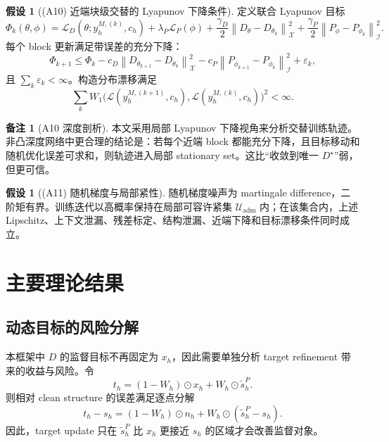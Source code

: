 \documentclass[11pt,a4paper,UTF8,fontset=fandol]{ctexart}
\theoremstyle{definition}
\newtheorem{assumption}[theorem]{假设}
\newtheorem{remark}[theorem]{备注}
\newcommand{\norm}[1]{\left\lVert#1\right\rVert}
\newcommand{\cL}{\mathcal{L}}
\begin{document}
\begin{assumption}[(A10) 近端块级交替的 Lyapunov 下降条件]
定义联合 Lyapunov 目标
\begin{equation}
\label{eq:lyapunov-coreA}
    \Phi_k(\theta,\phi)=
    \cL_D(\theta;y_h^{M,(k)},c_h)
    +\lambda_P\cL_P(\phi)
    +\frac{\gamma_D}{2}\norm{D_\theta-D_{\theta_k}}_{\mathcal X}^2
    +\frac{\gamma_P}{2}\norm{P_\phi-P_{\phi_k}}_{\mathcal I}^2.
\end{equation}
每个 block 更新满足带误差的充分下降：
\begin{equation}
\label{eq:lyapunov-descent-coreA}
    \Phi_{k+1}
    \le
    \Phi_k
    -c_D\norm{D_{\theta_{k+1}}-D_{\theta_k}}_{\mathcal X}^2
    -c_P\norm{P_{\phi_{k+1}}-P_{\phi_k}}_{\mathcal I}^2
    +\varepsilon_k,
\end{equation}
且 $\sum_k\varepsilon_k<\infty$。构造分布漂移满足
\begin{equation}
\label{eq:drift-summable-coreA}
    \sum_k W_1\big(\mathcal L(y_h^{M,(k+1)},c_h),\mathcal L(y_h^{M,(k)},c_h)\big)^2<\infty.
\end{equation}
\end{assumption}

\begin{remark}[A10 深度剖析]
本文采用局部 Lyapunov 下降视角来分析交替训练轨迹。非凸深度网络中更合理的结论是：若每个近端 block 都能充分下降，且目标移动和随机优化误差可求和，则轨迹进入局部 stationary set。这比“收敛到唯一 $D^\star$”弱，但更可信。
\end{remark}

\begin{assumption}[(A11) 随机梯度与局部紧性]
随机梯度噪声为 martingale difference，二阶矩有界。训练迭代以高概率保持在局部可容许紧集 $\mathcal U_{\mathrm{adm}}$ 内；在该集合内，上述 Lipschitz、上下文泄漏、残差标定、结构泄漏、近端下降和目标漂移条件同时成立。
\end{assumption}


\section{主要理论结果}

\subsection{动态目标的风险分解}

本框架中 $D$ 的监督目标不再固定为 $x_h$，因此需要单独分析 target refinement 带来的收益与风险。令
\begin{equation}
    t_h=(1-W_h)\odot x_h+W_h\odot\tilde s_h^P.
\end{equation}
则相对 clean structure 的误差满足逐点分解
\begin{equation}
\label{eq:target-error-decompose-coreB}
    t_h-s_h=(1-W_h)\odot n_h+W_h\odot(\tilde s_h^P-s_h).
\end{equation}
因此，target update 只在 $\tilde s_h^P$ 比 $x_h$ 更接近 $s_h$ 的区域才会改善监督对象。
\end{document}
